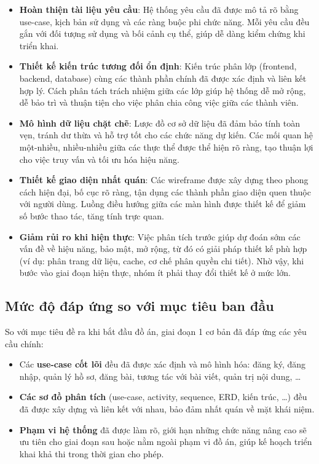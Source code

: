 \begin{itemize}
    \item \textbf{Hoàn thiện tài liệu yêu cầu}: Hệ thống yêu cầu đã được mô tả rõ bằng use-case, kịch bản sử dụng và các ràng buộc phi chức năng. Mỗi yêu cầu đều gắn với đối tượng sử dụng và bối cảnh cụ thể, giúp dễ dàng kiểm chứng khi triển khai.
    \item \textbf{Thiết kế kiến trúc tương đối ổn định}: Kiến trúc phân lớp (frontend, backend, database) cùng các thành phần chính đã được xác định và liên kết hợp lý. Cách phân tách trách nhiệm giữa các lớp giúp hệ thống dễ mở rộng, dễ bảo trì và thuận tiện cho việc phân chia công việc giữa các thành viên.
    \item \textbf{Mô hình dữ liệu chặt chẽ}: Lược đồ cơ sở dữ liệu đã đảm bảo tính toàn vẹn, tránh dư thừa và hỗ trợ tốt cho các chức năng dự kiến. Các mối quan hệ một-nhiều, nhiều-nhiều giữa các thực thể được thể hiện rõ ràng, tạo thuận lợi cho việc truy vấn và tối ưu hóa hiệu năng.
    \item \textbf{Thiết kế giao diện nhất quán}: Các wireframe được xây dựng theo phong cách hiện đại, bố cục rõ ràng, tận dụng các thành phần giao diện quen thuộc với người dùng. Luồng điều hướng giữa các màn hình được thiết kế để giảm số bước thao tác, tăng tính trực quan.
    \item \textbf{Giảm rủi ro khi hiện thực}: Việc phân tích trước giúp dự đoán sớm các vấn đề về hiệu năng, bảo mật, mở rộng, từ đó có giải pháp thiết kế phù hợp (ví dụ: phân trang dữ liệu, cache, cơ chế phân quyền chi tiết). Nhờ vậy, khi bước vào giai đoạn hiện thực, nhóm ít phải thay đổi thiết kế ở mức lớn.
\end{itemize}

\subsection{Mức độ đáp ứng so với mục tiêu ban đầu}

So với mục tiêu đề ra khi bắt đầu đồ án, giai đoạn 1 cơ bản đã đáp ứng các yêu cầu chính:

\begin{itemize}
    \item Các \textbf{use-case cốt lõi} đều đã được xác định và mô hình hóa: đăng ký, đăng nhập, quản lý hồ sơ, đăng bài, tương tác với bài viết, quản trị nội dung, \ldots
    \item \textbf{Các sơ đồ phân tích} (use-case, activity, sequence, ERD, kiến trúc, \ldots) đều đã được xây dựng và liên kết với nhau, bảo đảm nhất quán về mặt khái niệm.
    \item \textbf{Phạm vi hệ thống} đã được làm rõ, giới hạn những chức năng nâng cao sẽ ưu tiên cho giai đoạn sau hoặc nằm ngoài phạm vi đồ án, giúp kế hoạch triển khai khả thi trong thời gian cho phép.
\end{itemize}

